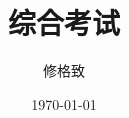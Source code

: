 \documentclass{ctexbook}
\title{综合考试}
\author{修格致}
\date{\today}
\begin{document}
\begin{titlepage}
    \maketitle    
\end{titlepage}


\tableofcontents








\end{document}
